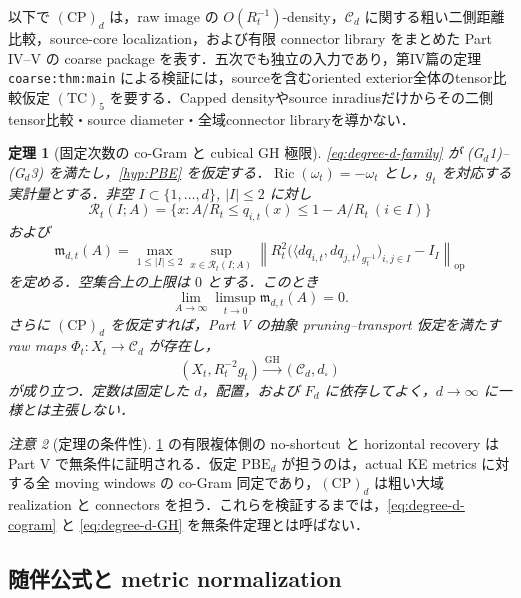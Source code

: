 \documentclass[a4paper,11pt]{ltjsarticle}
\numberwithin{equation}{section}
\theoremstyle{plain}
\newtheorem{theorem}{定理}[section]
\theoremstyle{definition}
\theoremstyle{remark}
\newtheorem{remark}[theorem]{注意}
\newcommand{\cC}{\mathcal C}
\newcommand{\Ric}{\operatorname{Ric}}
\newcommand{\GH}{\mathrm{GH}}
\newcommand{\Rt}{R_t}
\begin{document}
\noindent
以下で \(\mathrm{(CP)}_d\) は，raw image の \(O(\Rt^{-1})\)-density，\(\cC_d\) に関する粗い二側距離比較，source-core localization，および有限 connector library をまとめた Part IV--V の coarse package を表す．五次でも独立の入力であり，第IV篇の定理 \texttt{coarse:thm:main} による検証には，sourceを含むoriented exterior全体のtensor比較仮定 \(\mathrm{(TC)}_5\) を要する．Capped densityやsource inradiusだけからその二側tensor比較・source diameter・全域connector libraryを導かない．

\begin{theorem}[固定次数の co-Gram と cubical GH 極限]
\label{thm:degree-d-conditional}
\eqref{eq:degree-d-family} が \textup{(G\(_d\)1)--(G\(_d\)3)} を満たし，\cref{hyp:PBE} を仮定する．\(\Ric(\omega_t)=-\omega_t\) とし，\(g_t\) を対応する実計量とする．非空 \(I\subset\{1,\dots,d\}\), \(|I|\le2\) に対し
\[
 \mathcal R_t(I;A)=
 \{x:A/\Rt\le q_{i,t}(x)\le1-A/\Rt\ (i\in I)\}
\]
および
\[
 \mathfrak m_{d,t}(A)=
 \max_{1\le|I|\le2}\sup_{x\in\mathcal R_t(I;A)}
 \left\|
 \Rt^2\bigl(\langle dq_{i,t},dq_{j,t}\rangle_{g_t^{-1}}\bigr)_{i,j\in I}
 -I_I\right\|_{\mathrm{op}}
\]
を定める．空集合上の上限は \(0\) とする．このとき
\begin{equation}
 \lim_{A\to\infty}\limsup_{t\to0}\mathfrak m_{d,t}(A)=0.
\label{eq:degree-d-cogram}
\end{equation}
さらに \(\mathrm{(CP)}_d\) を仮定すれば，Part V の抽象 pruning--transport 仮定を満たす raw maps \(\Phi_t\colon X_t\to\cC_d\) が存在し，
\begin{equation}
 (X_t,\Rt^{-2}g_t)\xrightarrow{\GH}(\cC_d,d_\square)
\label{eq:degree-d-GH}
\end{equation}
が成り立つ．定数は固定した \(d\)，配置，および \(F_d\) に依存してよく，\(d\to\infty\) に一様とは主張しない．
\end{theorem}

\begin{remark}[定理の条件性]
\cref{thm:degree-d-conditional} の有限複体側の no-shortcut と horizontal recovery は Part V で無条件に証明される．仮定 \(\mathrm{PBE}_d\) が担うのは，actual KE metrics に対する全 moving windows の co-Gram 同定であり，\(\mathrm{(CP)}_d\) は粗い大域 realization と connectors を担う．これらを検証するまでは，\eqref{eq:degree-d-cogram} と \eqref{eq:degree-d-GH} を無条件定理とは呼ばない．
\end{remark}

\subsection{随伴公式と metric normalization}
\end{document}
